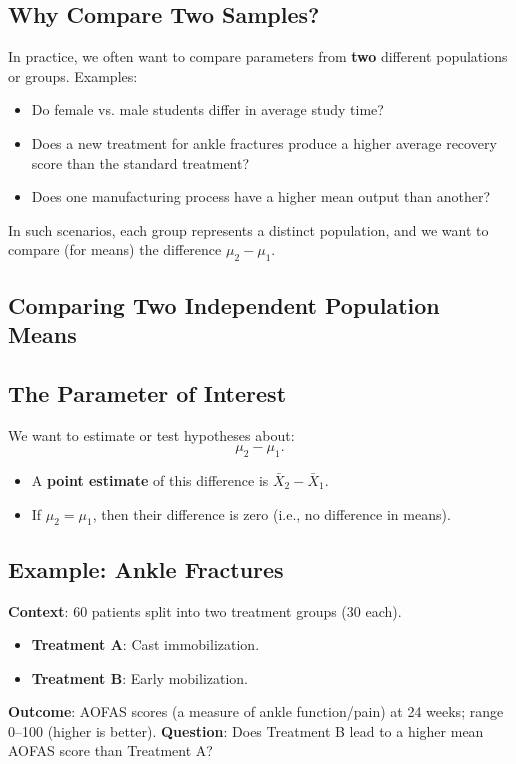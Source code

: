 \documentclass[10pt]{extarticle}
\begin{document}
\subsection{Why Compare Two Samples?}
In practice, we often want to compare parameters from \textbf{two} different populations or groups. Examples:
\begin{itemize}
    \item Do female vs. male students differ in average study time?
    \item Does a new treatment for ankle fractures produce a higher average recovery score than the standard treatment?
    \item Does one manufacturing process have a higher mean output than another?
\end{itemize}
In such scenarios, each group represents a distinct population, and we want to compare (for means) the difference $\mu_2 - \mu_1$.

\bigskip

\subsection{Comparing Two Independent Population Means}

\subsection{The Parameter of Interest}
We want to estimate or test hypotheses about:
\[
\mu_2 - \mu_1.
\]
\begin{itemize}
    \item A \textbf{point estimate} of this difference is $\bar{X}_2 - \bar{X}_1$.
    \item If $\mu_2 = \mu_1$, then their difference is zero (i.e., no difference in means).
\end{itemize}

\subsection{Example: Ankle Fractures}
\textbf{Context}: 60 patients split into two treatment groups (30 each).  
\begin{itemize}
    \item \textbf{Treatment A}: Cast immobilization.
    \item \textbf{Treatment B}: Early mobilization.
\end{itemize}
\textbf{Outcome}: AOFAS scores (a measure of ankle function/pain) at 24 weeks; range 0--100 (higher is better).  
\textbf{Question}: Does Treatment B lead to a higher mean AOFAS score than Treatment A?
\end{document}
